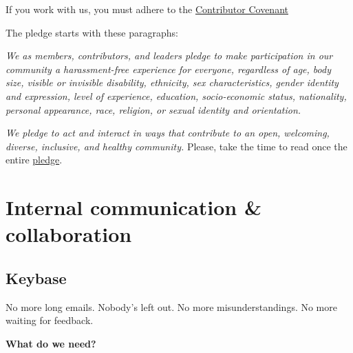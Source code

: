 \documentclass[
  a4paper,
  openany, a4paper, oneside]{book}
\begin{document}
If you work with us, you must adhere to the \href{https://www.contributor-covenant.org/version/2/0/code_of_conduct/}{Contributor Covenant}

The pledge starts with these paragraphs:

\emph{We as members, contributors, and leaders pledge to make participation in our community a harassment-free experience for everyone, regardless of age, body size, visible or invisible disability, ethnicity, sex characteristics, gender identity and expression, level of experience, education, socio-economic status, nationality, personal appearance, race, religion, or sexual identity and orientation.}

\emph{We pledge to act and interact in ways that contribute to an open, welcoming, diverse, inclusive, and healthy community.} Please, take the time to read once the entire \href{https://www.contributor-covenant.org/version/2/0/code_of_conduct/}{pledge}.

\hypertarget{internal-communication-collaboration}{%
\section{Internal communication \& collaboration}\label{internal-communication-collaboration}}

\hypertarget{keybase}{%
\subsection{Keybase}\label{keybase}}

No more long emails. Nobody's left out. No more misunderstandings. No more waiting for feedback.

\textbf{What do we need?}
\end{document}
